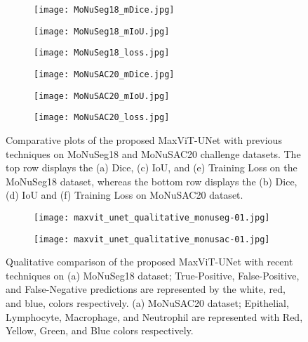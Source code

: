 \documentclass{article}
\begin{document}
\begin{figure}[ht!]
  \centering
  \begin{subfigure}[]{0.32\textwidth}
    \centering
    \texttt{[image: MoNuSeg18\_mDice.jpg]}
    \caption{}
    \label{fig:monuseg18-mDice}
  \end{subfigure}
  \hfill
  \begin{subfigure}[]{0.32\textwidth}
    \centering
    \texttt{[image: MoNuSeg18\_mIoU.jpg]}
    \caption{}
    \label{fig:monuseg18-mIoU}
  \end{subfigure}
  \hfill
  \begin{subfigure}[]{0.32\textwidth}
    \centering
    \texttt{[image: MoNuSeg18\_loss.jpg]}
    \caption{}
    \label{fig:monuseg18-loss}
  \end{subfigure}
  \hfill
  \begin{subfigure}[]{0.32\textwidth}
    \centering
    \texttt{[image: MoNuSAC20\_mDice.jpg]}
    \caption{}
    \label{fig:monusac20-mDice}
  \end{subfigure}
  \hfill
  \begin{subfigure}[]{0.32\textwidth}
    \centering
    \texttt{[image: MoNuSAC20\_mIoU.jpg]}
    \caption{}
    \label{fig:monusac20-mIoU}
  \end{subfigure}
  \hfill
  \begin{subfigure}[]{0.32\textwidth}
    \centering
    \texttt{[image: MoNuSAC20\_loss.jpg]}
    \caption{}
    \label{fig:monusac20-loss}
  \end{subfigure}
  \caption{Comparative plots of the proposed MaxViT-UNet with previous techniques on MoNuSeg18 and MoNuSAC20 challenge datasets. The top row displays the (a) Dice, (c) IoU, and (e) Training Loss on the MoNuSeg18 dataset, whereas the bottom row displays the (b) Dice, (d) IoU and (f) Training Loss on MoNuSAC20 dataset.}
  \label{fig:metric-plots}
\end{figure}

\begin{figure}[ht!]
  \centering
  \begin{subfigure}[]{0.48\textwidth}
    \centering
    \texttt{[image: maxvit\_unet\_qualitative\_monuseg-01.jpg]}
    \caption{}
    \label{fig:qualitative-monuseg-01}
  \end{subfigure}
  \hfill
  \begin{subfigure}[]{0.48\textwidth}
    \centering
    \texttt{[image: maxvit\_unet\_qualitative\_monusac-01.jpg]}
    \caption{}
    \label{fig:qualitative-monusac-01}
  \end{subfigure}
  \caption{Qualitative comparison of the proposed MaxViT-UNet with recent techniques on (a) MoNuSeg18 dataset; True-Positive, False-Positive, and False-Negative predictions are represented by the white, red, and blue, colors respectively. (a) MoNuSAC20 dataset; Epithelial, Lymphocyte, Macrophage, and Neutrophil are represented with Red, Yellow, Green, and Blue colors respectively.}
  \label{fig:qualitative-comparision}
\end{figure}
\end{document}
